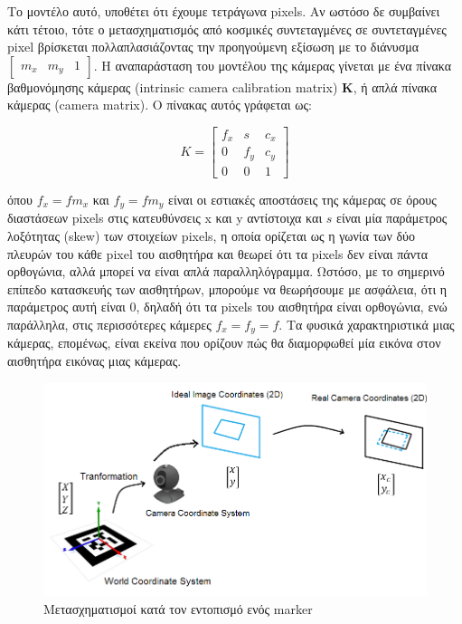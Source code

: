 Το μοντέλο αυτό, υποθέτει ότι έχουμε τετράγωνα pixels. Αν ωστόσο δε συμβαίνει κάτι τέτοιο, τότε ο μετασχηματισμός από κοσμικές συντεταγμένες σε συντεταγμένες pixel βρίσκεται πολλαπλασιάζοντας την προηγούμενη εξίσωση με το διάνυσμα $\begin{bmatrix}m_{x} & m_{y} & 1\end{bmatrix}$. 
Η αναπαράσταση του μοντέλου της κάμερας γίνεται με ένα πίνακα βαθμονόμησης κάμερας (intrinsic camera calibration matrix) $\mathbf{K}$, ή απλά πίνακα κάμερας (camera matrix).  
Ο πίνακας αυτός γράφεται ως:


\begin{equation}
K=
\begin{bmatrix}
f_{x} & s & c_{x}\\
0 & f_{y} & c_{y}\\
0 & 0 & 1
\end{bmatrix}
\end{equation}

όπου $f_{x}=fm_{x}$ και $f_{y}=fm_{y}$ είναι οι εστιακές αποστάσεις της κάμερας σε όρους διαστάσεων pixels στις κατευθύνσεις x και y αντίστοιχα και $s$ είναι μία παράμετρος λοξότητας (skew) των στοιχείων pixels, η οποία ορίζεται ως η γωνία των δύο πλευρών του κάθε pixel του αισθητήρα και θεωρεί ότι τα pixels δεν είναι πάντα ορθογώνια, αλλά μπορεί να είναι απλά παραλληλόγραμμα. Ωστόσο, με το σημερινό επίπεδο κατασκευής των αισθητήρων, μπορούμε να θεωρήσουμε με ασφάλεια, ότι η παράμετρος αυτή είναι 0, δηλαδή ότι τα pixels του αισθητήρα είναι ορθογώνια, ενώ παράλληλα, στις περισσότερες κάμερες $f_{x}=f_{y}=f$. Τα φυσικά χαρακτηριστικά μιας κάμερας, επομένως, είναι εκείνα που ορίζουν πώς θα διαμορφωθεί μία εικόνα στον αισθητήρα εικόνας μιας κάμερας.

\begin{figure}[H]
    \centering
    \includegraphics[scale=1.1, angle=0]{Files/Figures/transformation1.png}
    \caption[Μετασχηματισμοί κατά τον εντοπισμό ενός marker]{ Μετασχηματισμοί κατά τον εντοπισμό ενός marker}
    \label{fig:transformation1}
\end{figure}


